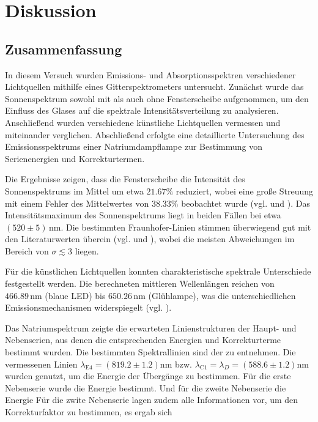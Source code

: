 \chapter{Diskussion}
\label{ch:Diskussion}

\section{Zusammenfassung}
\label{sec:Zusammenfassung}

In diesem Versuch wurden Emissions- und Absorptionsspektren verschiedener Lichtquellen mithilfe eines Gitterspektrometers untersucht. Zunächst wurde das Sonnenspektrum sowohl mit als auch ohne Fensterscheibe aufgenommen, um den Einfluss des Glases auf die spektrale Intensitätsverteilung zu analysieren. Anschließend wurden verschiedene künstliche Lichtquellen vermessen und miteinander verglichen. Abschließend erfolgte eine detaillierte Untersuchung des Emissionsspektrums einer Natriumdampflampe zur Bestimmung von Serienenergien und Korrekturtermen.

Die Ergebnisse zeigen, dass die Fensterscheibe die Intensität des Sonnenspektrums im Mittel um etwa $21.67\%$ reduziert, wobei eine große Streuung mit einem Fehler des Mittelwertes von $38.33\%$ beobachtet wurde (vgl.  und ). Das Intensitätsmaximum des Sonnenspektrums liegt in beiden Fällen bei etwa $(520 \pm 5)\,\mathrm{nm}$. Die bestimmten Fraunhofer-Linien stimmen überwiegend gut mit den Literaturwerten überein (vgl.  und ), wobei die meisten Abweichungen im Bereich von $\sigma \lesssim 3$ liegen.

Für die künstlichen Lichtquellen konnten charakteristische spektrale Unterschiede festgestellt werden. Die berechneten mittleren Wellenlängen reichen von $466.89\,\mathrm{nm}$ (blaue LED) bis $650.26\,\mathrm{nm}$ (Glühlampe), was die unterschiedlichen Emissionsmechanismen widerspiegelt (vgl. ). 

Das Natriumspektrum zeigte die erwarteten Linienstrukturen der Haupt- und Nebenserien, aus denen die entsprechenden Energien und Korrekturterme bestimmt wurden. Die bestimmten Spektrallinien sind der  zu entnehmen. Die vermessenen Linien $\lambda_\text{E4} = (819.2 \pm 1.2) \mathrm{nm}$ bzw. $\lambda_\text{C1} = \lambda_D = (588.6 \pm 1.2) \mathrm{nm}$ wurden genutzt, um die Energie der Übergänge zu bestimmen. Für die erste Nebenserie wurde die Energie
 \label{eq:resE3p}
bestimmt. Und für die zweite Nebenserie die Energie
Für die zwite Nebenserie lagen zudem alle Informationen vor, um den Korrekturfaktor zu bestimmen, es ergab sich


